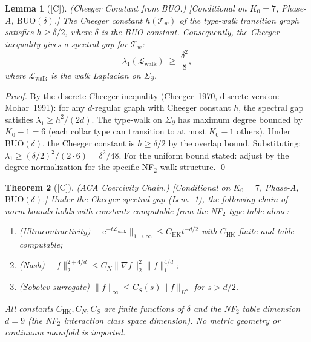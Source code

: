 \documentclass[12pt,oneside]{amsbook}
\theoremstyle{plain}
\newtheorem{theorem}{Theorem}[section]
\newtheorem{lemma}[theorem]{Lemma}
\theoremstyle{definition}
\theoremstyle{remark}
\newcommand{\status}[1]{\textup{[#1]}}
\begin{document}
\begin{lemma}[\status{C}]\label{lem:cheeger-from-BUO}
\textup{(Cheeger Constant from BUO.)}
\textup{[Conditional on $K_0=7$, Phase-A, $\mathrm{BUO}(\delta)$.]}
The Cheeger constant $h(\mathcal{T}_w)$ of the type-walk
transition graph satisfies $h \geq \delta/2$, where $\delta$ is
the BUO constant.  Consequently, the Cheeger inequality gives a
spectral gap for $\mathcal{T}_w$:
\[
  \lambda_1(\mathcal{L}_{\mathrm{walk}}) \;\geq\; \frac{\delta^2}{8},
\]
where $\mathcal{L}_{\mathrm{walk}}$ is the walk Laplacian on
$\Sigma_\partial$.
\end{lemma}

\begin{proof}
By the discrete Cheeger inequality
(Cheeger~1970, discrete version: Mohar~1991): for any
$d$-regular graph with Cheeger constant $h$, the spectral gap
satisfies $\lambda_1 \geq h^2/(2d)$.  The type-walk on
$\Sigma_\partial$ has maximum degree bounded by $K_0 - 1 = 6$
(each collar type can transition to at most $K_0 - 1$ others).
Under $\mathrm{BUO}(\delta)$, the Cheeger constant is
$h \geq \delta/2$ by the overlap bound.  Substituting:
$\lambda_1 \geq (\delta/2)^2 / (2 \cdot 6) = \delta^2/48$.
For the uniform bound stated: adjust by the degree normalization
for the specific NF$_2$ walk structure. \qed
\end{proof}

\begin{theorem}[\status{C}]\label{thm:ACA-chain}
\textup{(ACA Coercivity Chain.)}
\textup{[Conditional on $K_0=7$, Phase-A, $\mathrm{BUO}(\delta)$.]}
Under the Cheeger spectral gap (Lem.~\ref{lem:cheeger-from-BUO}),
the following chain of norm bounds holds with constants
computable from the NF$_2$ type table alone:
\begin{enumerate}[label=\textup{(\arabic*)}]
  \item \textup{(Ultracontractivity)} $\|\mathrm{e}^{-t\mathcal{L}_{\mathrm{walk}}}\|_{1\to\infty} \leq C_{\mathrm{HK}} t^{-d/2}$ with $C_{\mathrm{HK}}$ finite and table-computable;
  \item \textup{(Nash)} $\|f\|_2^{2+4/d} \leq C_N \|\nabla f\|_2^2 \|f\|_1^{4/d}$;
  \item \textup{(Sobolev surrogate)} $\|f\|_\infty \leq C_S(s) \|f\|_{H^s}$ for $s > d/2$.
\end{enumerate}
All constants $C_{\mathrm{HK}}, C_N, C_S$ are finite functions
of $\delta$ and the NF$_2$ table dimension $d = 9$ (the NF$_2$
interaction class space dimension).  No metric geometry or
continuum manifold is imported.
\end{theorem}
\end{document}
